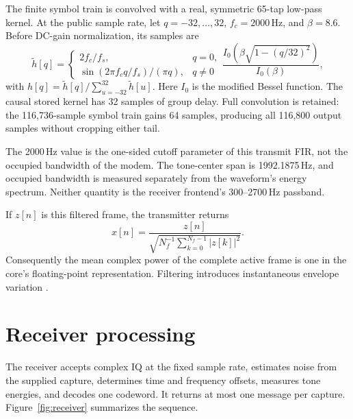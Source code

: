 \documentclass[11pt,a4paper]{article}
\newcommand{\Hz}{\,\mathrm{Hz}}
\begin{document}
The finite symbol train is convolved with a real, symmetric 65-tap
low-pass kernel. At the public sample rate, let $q=-32,\ldots,32$,
$f_c=2000\Hz$, and $\beta=8.6$. Before DC-gain normalization, its samples are
\begin{equation}
  \widetilde h[q]=
  \begin{cases}
    2f_c/f_s,&q=0,\\
    \sin(2\pi f_cq/f_s)/(\pi q),&q\ne0
  \end{cases}
  \frac{I_0\!\left(\beta\sqrt{1-(q/32)^2}\right)}{I_0(\beta)},
  \label{eq:fir}
\end{equation}
with $h[q]=\widetilde h[q]/\sum_{u=-32}^{32}\widetilde h[u]$.
Here $I_0$ is the modified Bessel function. The causal stored kernel has
32 samples of group delay. Full convolution is retained: the 116,736-sample
symbol train gains 64 samples, producing all 116,800 output samples without
cropping either tail.

The 2000\,Hz value is the one-sided cutoff parameter of this transmit FIR,
not the occupied bandwidth of the modem. The tone-center span is
1992.1875\,Hz, and occupied bandwidth is measured separately from the
waveform's energy spectrum. Neither quantity is the receiver frontend's
300--2700\,Hz passband.

If $z[n]$ is this filtered frame, the transmitter returns
\begin{equation}
  x[n]=\frac{z[n]}{\sqrt{N_f^{-1}\sum_{k=0}^{N_f-1}|z[k]|^2}}.
  \label{eq:normalization}
\end{equation}
Consequently the mean complex power of the complete active frame is one
in the core's floating-point representation. Filtering introduces
instantaneous envelope variation \cite{physical}.

\section{Receiver processing}
\label{sec:rx}

The receiver accepts complex IQ at the fixed sample rate, estimates noise
from the supplied capture, determines time and frequency offsets, measures
tone energies, and decodes one codeword. It returns at most one message per
capture. Figure~\ref{fig:receiver} summarizes the sequence.
\end{document}
